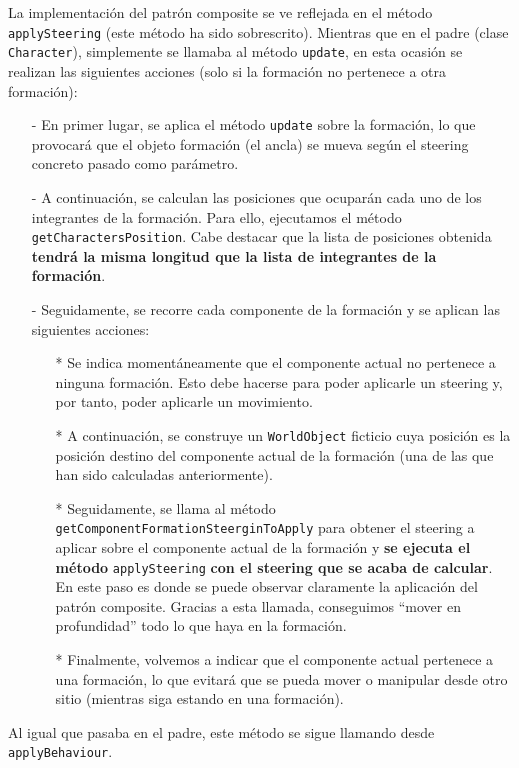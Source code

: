 La implementación del patrón composite se ve reflejada en el método \texttt{applySteering} (este método ha sido sobrescrito). Mientras que en el padre (clase \texttt{Character}), simplemente se llamaba al método \texttt{update}, en esta ocasión se realizan las siguientes acciones (solo si la formación no pertenece a otra formación):
\begin{itemize}
	\item[-] En primer lugar, se aplica el método \texttt{update} sobre la formación, lo que provocará que el objeto formación (el ancla) se mueva según el steering concreto pasado como parámetro.
	\item[-] A continuación, se calculan las posiciones que ocuparán cada uno de los integrantes de la formación. Para ello, ejecutamos el método \texttt{getCharactersPosition}. Cabe destacar que la lista de posiciones obtenida \textbf{tendrá la misma longitud que la lista de integrantes de la formación}.
	\item[-] Seguidamente, se recorre cada componente de la formación y se aplican las siguientes acciones:
	\begin{itemize}
		\item[*] Se indica momentáneamente que el componente actual no pertenece a ninguna formación. Esto debe hacerse para poder aplicarle un steering y, por tanto, poder aplicarle un movimiento.
		\item[*] A continuación, se construye un \texttt{WorldObject} ficticio cuya posición es la posición destino del componente actual de la formación (una de las que han sido calculadas anteriormente).
		\item[*] Seguidamente, se llama al método \texttt{getComponentFormationSteerginToApply} para obtener el steering a aplicar sobre el componente actual de la formación y \textbf{se ejecuta el método} \texttt{applySteering} \textbf{con el steering que se acaba de calcular}. En este paso es donde se puede observar claramente la aplicación del patrón composite. Gracias a esta llamada, conseguimos ``mover en profundidad'' todo lo que haya en la formación.
		\item[*] Finalmente, volvemos a indicar que el componente actual pertenece a una formación, lo que evitará que se pueda mover o manipular desde otro sitio (mientras siga estando en una formación).
	\end{itemize}
\end{itemize}

Al igual que pasaba en el padre, este método se sigue llamando desde \texttt{applyBehaviour}. \\

